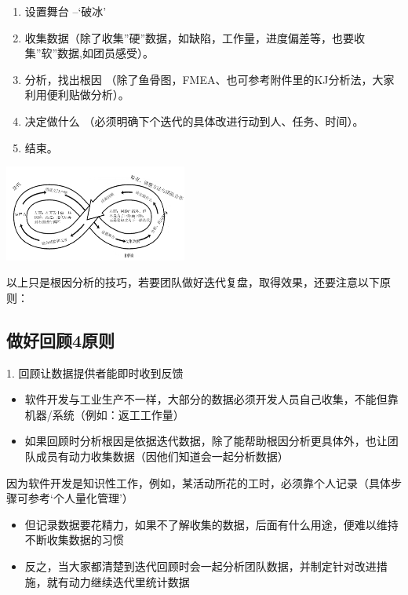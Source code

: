 \begin{enumerate}
\tightlist
\item
  设置舞台 --`破冰'
\item
  收集数据（除了收集”硬”数据，如缺陷，工作量，进度偏差等，也要收集”软”数据,如团员感受）。
\item
  分析，找出根因
  （除了鱼骨图，FMEA、也可参考附件里的KJ分析法，大家利用便利贴做分析）。
\item
  决定做什么 （必须明确下个迭代的具体改进行动到人、任务、时间）。
\item
  结束。
\end{enumerate}


\includegraphics[width=6cm]{RetrospectiveScreenshot_2021-09-21_173119.png}

以上只是根因分析的技巧，若要团队做好迭代复盘，取得效果，还要注意以下原则：

\hypertarget{ux505aux597dux56deux987e4ux539fux5219}{%
\subsection{做好回顾4原则}\label{ux505aux597dux56deux987e4ux539fux5219}}

1. 回顾让数据提供者能即时收到反馈\\


\begin{itemize}
\tightlist
\item
  软件开发与工业生产不一样，大部分的数据必须开发人员自己收集，不能但靠机器/系统（例如：返工工作量）
\item
  如果回顾时分析根因是依据迭代数据，除了能帮助根因分析更具体外，也让团队成员有动力收集数据（因他们知道会一起分析数据）
\end{itemize}

因为软件开发是知识性工作，例如，某活动所花的工时，必须靠个人记录（具体步骤可参考`个人量化管理'）

\begin{itemize}
\tightlist
\item
  但记录数据要花精力，如果不了解收集的数据，后面有什么用途，便难以维持不断收集数据的习惯
\item
  反之，当大家都清楚到迭代回顾时会一起分析团队数据，并制定针对改进措施，就有动力继续迭代里统计数据
\end{itemize}

